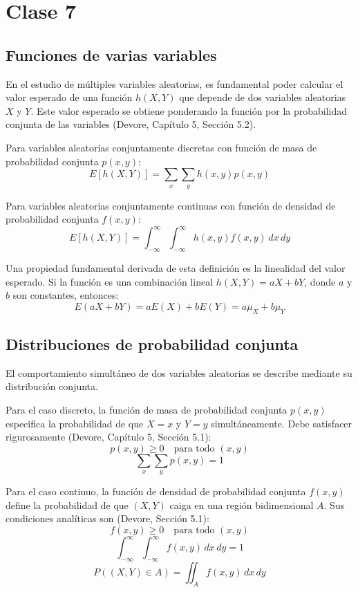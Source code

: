\chapter{Clase 7}

\section{Funciones de varias variables}

En el estudio de múltiples variables aleatorias, es fundamental poder calcular el valor esperado de una función $h(X,Y)$ que depende de dos variables aleatorias $X$ y $Y$. Este valor esperado se obtiene ponderando la función por la probabilidad conjunta de las variables (Devore, Capítulo 5, Sección 5.2).

Para variables aleatorias conjuntamente discretas con función de masa de probabilidad conjunta $p(x,y)$:
$$ E[h(X,Y)] = \sum_{x} \sum_{y} h(x,y) p(x,y) $$

Para variables aleatorias conjuntamente continuas con función de densidad de probabilidad conjunta $f(x,y)$:
$$ E[h(X,Y)] = \int_{-\infty}^{\infty} \int_{-\infty}^{\infty} h(x,y) f(x,y) \, dx \, dy $$

Una propiedad fundamental derivada de esta definición es la linealidad del valor esperado. Si la función es una combinación lineal $h(X,Y) = aX + bY$, donde $a$ y $b$ son constantes, entonces:
$$ E(aX + bY) = aE(X) + bE(Y) = a\mu_X + b\mu_Y $$

\section{Distribuciones de probabilidad conjunta}

El comportamiento simultáneo de dos variables aleatorias se describe mediante su distribución conjunta. 

Para el caso discreto, la función de masa de probabilidad conjunta $p(x,y)$ especifica la probabilidad de que $X=x$ y $Y=y$ simultáneamente. Debe satisfacer rigurosamente (Devore, Capítulo 5, Sección 5.1):
$$ p(x,y) \ge 0 \quad \text{para todo } (x,y) $$
$$ \sum_{x} \sum_{y} p(x,y) = 1 $$

Para el caso continuo, la función de densidad de probabilidad conjunta $f(x,y)$ define la probabilidad de que $(X,Y)$ caiga en una región bidimensional $A$. Sus condiciones analíticas son (Devore, Sección 5.1):
$$ f(x,y) \ge 0 \quad \text{para todo } (x,y) $$
$$ \int_{-\infty}^{\infty} \int_{-\infty}^{\infty} f(x,y) \, dx \, dy = 1 $$
$$ P((X,Y) \in A) = \iint_{A} f(x,y) \, dx \, dy $$

